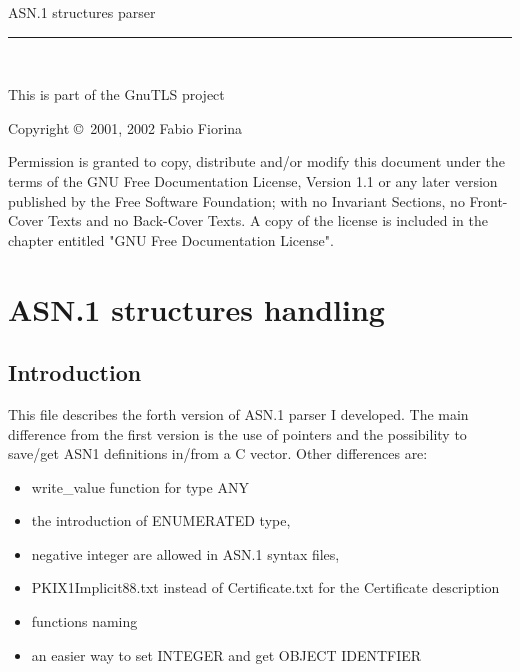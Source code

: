 \documentclass{book}
\newcommand{\HRule}{\rule{\linewidth}{0.4mm}}
\begin{document}
{\Large{ASN.1 structures parser}}
\vspace{-.3cm}
\\
\HRule
\vspace{-.6cm}
\\
\begin{flushright}
This is part of the GnuTLS project\\
\end{flushright}


\begin{center}
\par
Copyright \copyright\ 2001, 2002 Fabio Fiorina\\
\setlength{\parskip}{4mm}
\par
Permission is granted to copy, distribute and/or modify this
document under the terms of the GNU Free Documentation License,
Version 1.1 or any later version published by the Free Software
Foundation; with no Invariant Sections, no Front-Cover Texts and
no Back-Cover Texts.  A copy of the license is included in the
chapter entitled "GNU Free Documentation License".
\end{center}

\setlength{\parindent}{2mm}

\setlength{\parskip}{1mm}

\tableofcontents

\chapter{ASN.1 structures handling}

\section{Introduction}
 This file describes the forth version of ASN.1 parser I
developed.
The main difference from the first version is the use of pointers and the
possibility to save/get ASN1 definitions in/from a C vector.
Other differences are:
\begin{itemize}
\item write\_value function for type ANY
\item the introduction of ENUMERATED type,
\item negative integer are allowed in ASN.1 syntax files,
\item PKIX1Implicit88.txt instead of Certificate.txt for the Certificate description
\item functions naming 
\item an easier way to set INTEGER and get OBJECT IDENTFIER  
\end{itemize}
\end{document}
